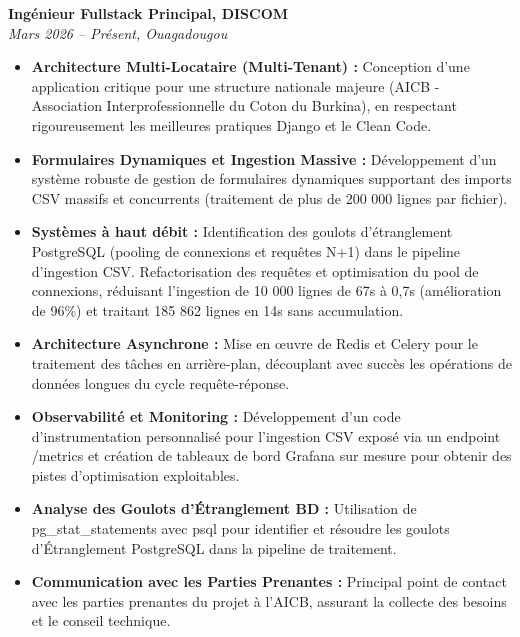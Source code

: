 \documentclass[a4paper,10pt]{article}
\newcommand{\jobheader}[4]{%
    \textbf{#1, #2} \\
    \textit{#3, #4}
    \vspace{0.05cm}
}
\begin{document}
\jobheader{Ingénieur Fullstack Principal}{DISCOM}{Mars 2026 -- Présent}{Ouagadougou}
\begin{itemize}[leftmargin=*,nosep]
    \item \textbf{Architecture Multi-Locataire (Multi-Tenant) :} Conception d'une application critique pour une structure nationale majeure (AICB - Association Interprofessionnelle du Coton du Burkina), en respectant rigoureusement les meilleures pratiques Django et le Clean Code.
    \item \textbf{Formulaires Dynamiques et Ingestion Massive :} Développement d'un système robuste de gestion de formulaires dynamiques supportant des imports CSV massifs et concurrents (traitement de plus de 200 000 lignes par fichier).
    \item \textbf{Systèmes à haut débit :} Identification des goulots d'étranglement PostgreSQL (pooling de connexions et requêtes N+1) dans le pipeline d'ingestion CSV. Refactorisation des requêtes et optimisation du pool de connexions, réduisant l'ingestion de 10 000 lignes de 67s à 0,7s (amélioration de 96\%) et traitant 185 862 lignes en 14s sans accumulation.
    \item \textbf{Architecture Asynchrone :} Mise en œuvre de Redis et Celery pour le traitement des tâches en arrière-plan, découplant avec succès les opérations de données longues du cycle requête-réponse.
    \item \textbf{Observabilité et Monitoring :} Développement d'un code d'instrumentation personnalisé pour l'ingestion CSV exposé via un endpoint /metrics et création de tableaux de bord Grafana sur mesure pour obtenir des pistes d'optimisation exploitables.
    \item \textbf{Analyse des Goulots d'Étranglement BD :} Utilisation de pg\_stat\_statements avec psql pour identifier et résoudre les goulots d'Étranglement PostgreSQL dans la pipeline de traitement.
    \item \textbf{Communication avec les Parties Prenantes :} Principal point de contact avec les parties prenantes du projet à l'AICB, assurant la collecte des besoins et le conseil technique.
\end{itemize}

\vspace{0.15cm}
\end{document}
